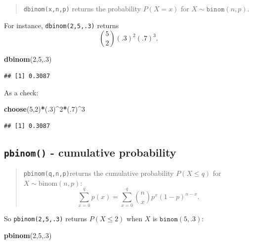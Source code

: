 \documentclass[
]{book}
\newenvironment{Shaded}{\begin{snugshade}}{\end{snugshade}}
\newcommand{\DecValTok}[1]{\textcolor[rgb]{0.00,0.00,0.81}{#1}}
\newcommand{\FunctionTok}[1]{\textcolor[rgb]{0.13,0.29,0.53}{\textbf{#1}}}
\newcommand{\NormalTok}[1]{#1}
\newcommand{\SpecialCharTok}[1]{\textcolor[rgb]{0.81,0.36,0.00}{\textbf{#1}}}
\theoremstyle{definition}
\theoremstyle{definition}
\theoremstyle{definition}
\theoremstyle{definition}
\theoremstyle{remark}
\begin{document}
\begin{quote}
\texttt{dbinom(x,n,p)} returns the probability \(P(X = x)\) for \(X \sim \texttt{binom}(n,p)\).
\end{quote}

For instance, \texttt{dbinom(2,5,.3)} returns \[\binom{5}{2}(.3)^2(.7)^3.\]

\begin{Shaded}
\begin{Highlighting}[]
\FunctionTok{dbinom}\NormalTok{(}\DecValTok{2}\NormalTok{,}\DecValTok{5}\NormalTok{,.}\DecValTok{3}\NormalTok{)}
\end{Highlighting}
\end{Shaded}

\begin{verbatim}
## [1] 0.3087
\end{verbatim}

As a check:

\begin{Shaded}
\begin{Highlighting}[]
\FunctionTok{choose}\NormalTok{(}\DecValTok{5}\NormalTok{,}\DecValTok{2}\NormalTok{)}\SpecialCharTok{*}\NormalTok{(.}\DecValTok{3}\NormalTok{)}\SpecialCharTok{\^{}}\DecValTok{2}\SpecialCharTok{*}\NormalTok{(.}\DecValTok{7}\NormalTok{)}\SpecialCharTok{\^{}}\DecValTok{3}
\end{Highlighting}
\end{Shaded}

\begin{verbatim}
## [1] 0.3087
\end{verbatim}

\subsection*{\texorpdfstring{\texttt{pbinom()} - cumulative probability}{pbinom() - cumulative probability}}\label{pbinom---cumulative-probability}

\begin{quote}
\texttt{pbinom(q,n,p)}returns the cumulative probability \(P(X \leq q)\) for \(X \sim \text{binom}(n,p)\): \[\sum_{x=0}^q p(x)=\sum_{x=0}^q\binom{n}{x}p^x(1-p)^{n-x}.\]
\end{quote}

So \texttt{pbinom(2,5,.3)} returns \(P(X \leq 2)\) when \(X\) is \(\texttt{binom}(5,.3)\):

\begin{Shaded}
\begin{Highlighting}[]
\FunctionTok{pbinom}\NormalTok{(}\DecValTok{2}\NormalTok{,}\DecValTok{5}\NormalTok{,.}\DecValTok{3}\NormalTok{)}
\end{Highlighting}
\end{Shaded}
\end{document}
